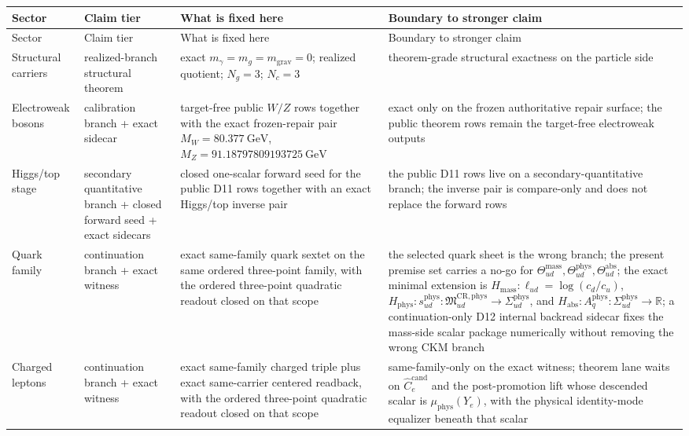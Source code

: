 \scriptsize
\setlength{\tabcolsep}{2pt}
\begin{longtable}{@{}>{\raggedright\arraybackslash}p{}>{\raggedright\arraybackslash}p{}>{\raggedright\arraybackslash}p{}>{\raggedright\arraybackslash}p{}@{}}
\toprule
Sector & Claim tier & What is fixed here & Boundary to stronger claim \\
\midrule
\endfirsthead
\toprule
Sector & Claim tier & What is fixed here & Boundary to stronger claim \\
\midrule
\endhead
\bottomrule
\endfoot
Structural carriers & realized-branch structural theorem & exact \(m_\gamma=m_g=m_{\mathrm{grav}}=0\); realized quotient; \(N_g=3\); \(N_c=3\) & theorem-grade structural exactness on the particle side \\
Electroweak bosons & calibration branch + exact sidecar & target-free public \(W/Z\) rows together with the exact frozen-repair pair \(M_W=80.377~\mathrm{GeV}\), \(M_Z=91.18797809193725~\mathrm{GeV}\) & exact only on the frozen authoritative repair surface; the public theorem rows remain the target-free electroweak outputs \\
Higgs/top stage & secondary quantitative branch + closed forward seed + exact sidecars & closed one-scalar forward seed for the public D11 rows together with an exact Higgs/top inverse pair & the public D11 rows live on a secondary-quantitative branch; the inverse pair is compare-only and does not replace the forward rows \\
Quark family & continuation branch + exact witness & exact same-family quark sextet on the same ordered three-point family, with the ordered three-point quadratic readout closed on that scope & the selected quark sheet is the wrong branch; the present premise set carries a no-go for \(\Theta_{ud}^{\mathrm{mass}},\Theta_{ud}^{\mathrm{phys}},\Theta_{ud}^{\mathrm{abs}}\); the exact minimal extension is \(H_{\mathrm{mass}}:\ell_{ud}=\log(c_d/c_u)\), \(H_{\mathrm{phys}}:s_{ud}^{\mathrm{phys}}:\mathfrak M_{ud}^{\mathrm{CR,phys}}\to\Sigma_{ud}^{\mathrm{phys}}\), and \(H_{\mathrm{abs}}:A_q^{\mathrm{phys}}:\Sigma_{ud}^{\mathrm{phys}}\to\mathbb R\); a continuation-only D12 internal backread sidecar fixes the mass-side scalar package numerically without removing the wrong CKM branch \\
Charged leptons & continuation branch + exact witness & exact same-family charged triple plus exact same-carrier centered readback, with the ordered three-point quadratic readout closed on that scope & same-family-only on the exact witness; theorem lane waits on \(\widehat C_e^{\mathrm{cand}}\) and the post-promotion lift whose descended scalar is \(\mu_{\mathrm{phys}}(Y_e)\), with the physical identity-mode equalizer beneath that scalar \\

\end{longtable}
